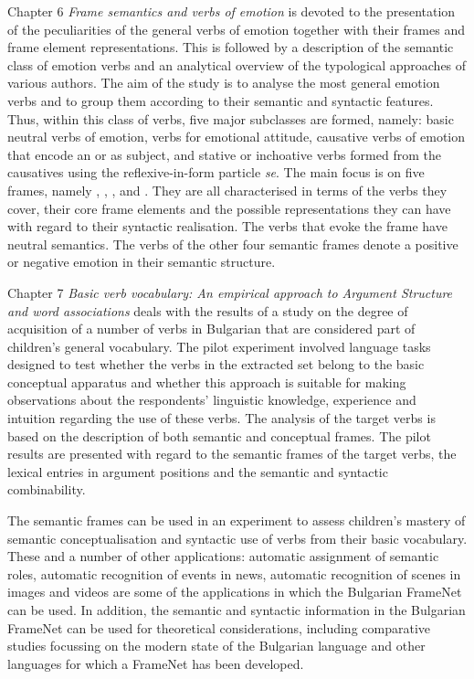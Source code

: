 \begin{refsection}
Chapter 6 \textit{Frame semantics and verbs of emotion} is devoted to the presentation of the peculiarities of the general verbs of emotion together with their frames and frame element representations. This is followed by a description of the semantic class of emotion verbs and an analytical overview of the typological approaches of various authors. The aim of the study is to analyse the most general emotion verbs and to group them according to their semantic and syntactic features. Thus, within this class of verbs, five major subclasses are formed, namely: basic neutral verbs of emotion, verbs for emotional attitude, causative verbs of emotion that encode an  or  as subject, and stative or inchoative verbs formed from the causatives using the reflexive-in-form particle \textit{se}. The main focus is on five frames, namely , , ,  and . They are all characterised in terms of the verbs they cover, their core frame elements and the possible representations they can have with regard to their syntactic realisation. The verbs that evoke the frame  have neutral semantics. The verbs of the other four semantic frames denote a positive or negative emotion in their semantic structure.


Chapter 7 \textit{Basic verb vocabulary: An empirical approach to Argument Structure and word associations} deals with the results of a study on the degree of acquisition of a number of verbs in Bulgarian that are considered part of children's general vocabulary. The pilot experiment involved language tasks designed to test whether the verbs in the extracted set belong to the basic conceptual apparatus and whether this approach is suitable for making observations about the respondents' linguistic knowledge, experience and intuition regarding the use of these verbs. The analysis of the target verbs is based on the description of both semantic and conceptual frames. The pilot results are presented with regard to the semantic frames of the target verbs, the lexical entries in argument positions and the semantic and syntactic combinability.

The semantic frames can be used in an experiment to assess children's mastery of semantic conceptualisation and syntactic use of verbs from their basic vocabulary. These and a number of other applications: automatic assignment of semantic roles, automatic recognition of events in news, automatic recognition of scenes in images and videos are some of the applications in which the Bulgarian FrameNet can be used. In addition, the semantic and syntactic information in the Bulgarian FrameNet can be used for theoretical considerations, including comparative studies focussing on the modern state of the Bulgarian language and other languages for which a FrameNet has been developed.

{\sloppy\printbibliography[heading=subbibliography]}
\end{refsection}

